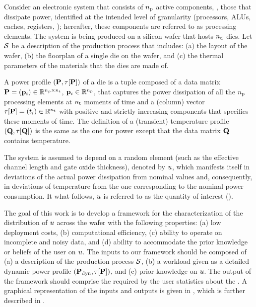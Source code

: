 Consider an electronic system that consists of ${n_\text{p}}$ active components, \ie, those that dissipate power, identified at the intended level of granularity (processors, ALUs, caches, registers, \etc); hereafter, these components are referred to as processing elements.
The system is being produced on a silicon wafer that hosts ${n_\text{d}}$ dies.
Let $\mathcal{S}$ be a description of the production process that includes: (a) the layout of the wafer, (b) the floorplan of a single die on the wafer, and (c) the thermal parameters of the materials that the dies are made of.

A power profile $\profileP$ of a die is a tuple composed of a data matrix $\mathbf{P} = (\mathbf{p}_i) \in \mathbb{R}^{{n_\text{p}} \times {n_\text{t}}}$, $\mathbf{p}_i \in \mathbb{R}^{n_\text{p}}$, that captures the power dissipation of all the ${n_\text{p}}$ processing elements at ${n_\text{t}}$ moments of time and a (column) vector $\tau[\mathbf{P}] = (t_i) \in \mathbb{R}^{{n_\text{t}}}$ with positive and strictly increasing components that specifies these moments of time.
The definition of a (transient) temperature profile $\profileT$ is the same as the one for power except that the data matrix $\mathbf{Q}$ contains temperature.

The system is assumed to depend on a random element (such as the effective channel length and gate oxide thickness), denoted by $u$, which manifests itself in deviations of the actual power dissipation from nominal values and, consequently, in deviations of temperature from the one corresponding to the nominal power consumption. It what follows, $u$ is referred to as the quantity of interest (\qoi).

The goal of this work is to develop a framework for the characterization of the distribution of $u$ across the wafer with the following properties: (a) low deployment costs, (b) computational efficiency, (c) ability to operate on incomplete and noisy data, and (d) ability to accommodate the prior knowledge or beliefs of the user on $u$.
The inputs to our framework should be composed of (a) a description of the production process $\mathcal{S}$, (b) a workload given as a detailed dynamic power profile $(\mathbf{P}_{\text{dyn}}, \tau[\mathbf{P}])$, and (c) prior knowledge on $u$.
The output of the framework should comprise the required by the user statistics about the \qoi.
A graphical representation of the inputs and outputs is given in , which is further described in .

